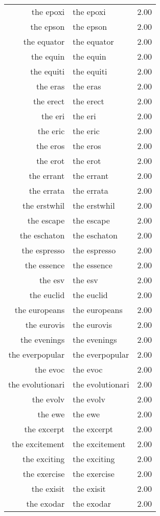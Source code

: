 \begin{table}[ht]
\begin{tabular}{rlr}
  the epoxi & the epoxi & 2.00 \\ 
  the epson & the epson & 2.00 \\ 
  the equator & the equator & 2.00 \\ 
  the equin & the equin & 2.00 \\ 
  the equiti & the equiti & 2.00 \\ 
  the eras & the eras & 2.00 \\ 
  the erect & the erect & 2.00 \\ 
  the eri & the eri & 2.00 \\ 
  the eric & the eric & 2.00 \\ 
  the eros & the eros & 2.00 \\ 
  the erot & the erot & 2.00 \\ 
  the errant & the errant & 2.00 \\ 
  the errata & the errata & 2.00 \\ 
  the erstwhil & the erstwhil & 2.00 \\ 
  the escape & the escape & 2.00 \\ 
  the eschaton & the eschaton & 2.00 \\ 
  the espresso & the espresso & 2.00 \\ 
  the essence & the essence & 2.00 \\ 
  the esv & the esv & 2.00 \\ 
  the euclid & the euclid & 2.00 \\ 
  the europeans & the europeans & 2.00 \\ 
  the eurovis & the eurovis & 2.00 \\ 
  the evenings & the evenings & 2.00 \\ 
  the everpopular & the everpopular & 2.00 \\ 
  the evoc & the evoc & 2.00 \\ 
  the evolutionari & the evolutionari & 2.00 \\ 
  the evolv & the evolv & 2.00 \\ 
  the ewe & the ewe & 2.00 \\ 
  the excerpt & the excerpt & 2.00 \\ 
  the excitement & the excitement & 2.00 \\ 
  the exciting & the exciting & 2.00 \\ 
  the exercise & the exercise & 2.00 \\ 
  the exisit & the exisit & 2.00 \\ 
  the exodar & the exodar & 2.00 \\ 

\end{tabular}
\end{table}
